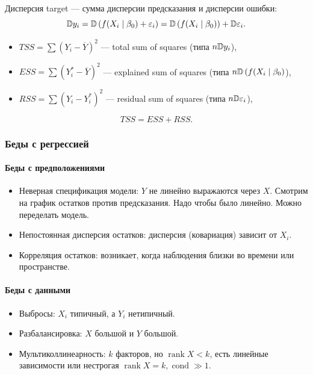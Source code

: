 \documentclass[11pt]{book}
\begin{document}
Дисперсия target --- сумма дисперсии предсказания и дисперсии ошибки:
\[
\mathbb{D} y_i = \mathbb{D} \left( f (X_i \mid \beta_0) + \varepsilon_i \right)  = \mathbb{D} \left( f(X_i \mid \beta_0) \right) + \mathbb{D} \varepsilon_i
.\] 
\begin{itemize}
	\item $TSS = \sum (Y_i - \overline{Y})^2 $ --- total sum of squares (типа $n \mathbb{D} y_i$),
	\item $ESS = \sum (Y_i^* - \overline{Y})^2 $ --- explained sum of squares (типа $n \mathbb{D} \left( f(X_i \mid \beta_0 \right)	$),
	\item $RSS = \sum (Y_i - Y_i^*)^2 $ --- residual sum of squares (типа $n \mathbb{D} \varepsilon_i$),
\end{itemize}
\[
TSS = ESS + RSS
.\] 
\subsubsection{Беды с регрессией}
\paragraph{Беды с предположениями}
\begin{itemize}
	\item Неверная спецификация модели: $Y$ не линейно выражаются через $X$. Смотрим на график остатков против предсказания. Надо чтобы было линейно. Можно переделать модель.
	\item Непостоянная дисперсия остатков: дисперсия (ковариация) зависит от $X_i$.
	\item Корреляция остатков: возникает, когда наблюдения близки во времени или пространстве.
\end{itemize}
\paragraph{Беды с данными}
\begin{itemize}
	\item Выбросы: $X_i$ типичный, а $Y_i$ нетипичный.
	\item Разбалансировка: $X$ большой и $Y$ большой.
	\item Мультиколлинеарность:  $k$ факторов, но $\operatorname{rank} X < k$, есть линейные зависимости или нестрогая $\operatorname{rank} X = k, \operatorname{cond} \gg 1$.
\end{itemize}
\end{document}
